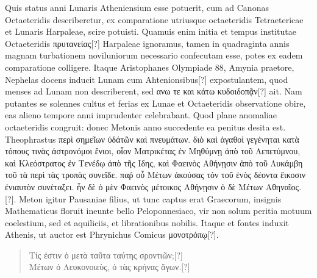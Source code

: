 Quis status anni Lunaris Atheniensium esse potuerit, cum ad
Canonas Octaeteridis describeretur, ex comparatione utriusque
octaeteridis Tetraetericae et Lunaris Harpaleae, scire potuisti.
Quamuis enim initia et tempus institutae Octaeteridis 
 \textgreek{πρυτανείας[?]}
Harpaleae ignoramus, tamen in quadraginta annis magnam turbationem
noviluniorum necessario confecutam esse, potes ex eadem
comparatione colligere.
Itaque Aristophanes Olympiade 88, Amynia
praetore, Nephelas docens inducit Lunam cum Ahtenionsibus[?] expostulantem,
quod menses ad Lunam non describerent, sed \textgreek{ανω τε και
κάτω κυδοιδοπᾷν[?]}
ait.
Nam putantes se solennes cultus et ferias ex Lunae
et Octaeteridis observatione obire, eas alieno tempore anni imprudenter
celebrabant.
Quod plane anomaliae octaeteridis congruit:
donec Metonis anno succedente ea penitus desita est.
Theophrastus
\textgreek{περὶ σημεῖων ὑδάτῶν καὶ πνευμάτων.}
\textgreek{διὸ καὶ ἀγαθοὶ γεγένηται  κατὰ τόπους τινὰς
ἀστρονόμοι ἔνιοι, οἷον Ματρικέτας ἐν Μηθύμνῃ ἀπὸ τοῦ Λεπετύμνου, καὶ Κλεόστρατος
ἐν Τενέδῳ ἀπὸ τῆς Ιδης, καὶ Φαεινὸς Αθήνῃσιν ἀπὸ τοῦ Λυκάμβη τοῦ τὰ
 περὶ τὰς τροπὰς
συνεῖδε.}
\textgreek{παῤ οὗ Μέτων ἀκούσας τόν τοῦ ἑνὸς δέοντα ἔικοσιν ἐνιαυτὸν
 συνὲταξει.
ἦν δὲ ὁ μὲν Φαεινὸς μέτοικος Αθήνῃσιν ὁ δὲ Μέτων Αθηναῖος. [?]}.
Meton igitur Pausaniae filius, ut tunc captus erat Graecorum,
 insignis Mathematicus
floruit ineunte bello Peloponnesiaco, vir non solum peritia motuum
coelestium, sed et aquiliciis, et librationibus nobilis.
Itaque et
fontes induxit Athenis, ut auctor est
 Phrynichus Comicus \textgreek{μονοτρόπῳ[?]}.
\begin{quote}
\textgreek{Τίς ἐστιν ὁ μετὰ ταῦτα ταύτης σροντιῶν;[?]}\\
\textgreek{Μέτων ὁ Λευκονοιεὺς, ὁ τὰς κρήνας ἄγων.[?]}
\end{quote}

